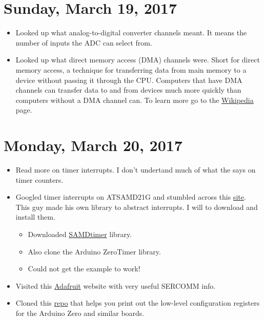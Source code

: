 \documentclass[12pt]{article}
\begin{document}
\section{Sunday, March 19, 2017}
\begin{itemize}
\item Looked up what analog-to-digital converter channels meant. It means the number of inputs the ADC can select from.
\item Looked up what direct memory access (DMA) channels were. Short for direct memory access, a technique for transferring data from main memory to a device without passing it through the CPU. Computers that have DMA channels can transfer data to and from devices much more quickly than computers without a DMA channel can. To learn more go to the \href{https://en.wikipedia.org/wiki/Direct_memory_access}{Wikipedia} page.
\end{itemize}

\section{Monday, March 20, 2017}
\begin{itemize}
\item Read more on timer interrupts. I don't undertand much of what the says on timer counters.
\item Googled timer interrupts on ATSAMD21G and stumbled across this \href{http://www.avdweb.nl/arduino/libraries/samd21-timer.html}{site}. This guy made his own library to abstract interrupts. I will to download and install them.
	\begin{itemize}
	\item Downloaded \href{https://github.com/avandalen/avdweb_SAMDtimer}{SAMDtimer} library.
	\item Also clone the Arduino ZeroTimer library.
	\item Could not get the example to work!
	\end{itemize}
\item Visited this \href{https://learn.adafruit.com/using-atsamd21-sercom-to-add-more-spi-i2c-serial-ports/muxing-it-up}{Adafruit} website with very useful SERCOMM info.
\item Cloned this \href{https://github.com/drewfish/arduino-ZeroRegs}{repo} that helps you print out the low-level configuration registers for the Arduino Zero and similar boards.
\end{itemize}
\end{document}

